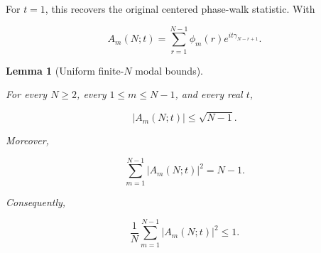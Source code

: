 \documentclass[11pt]{amsart}
\numberwithin{equation}{section}
\theoremstyle{plain}
\newtheorem{lemma}[theorem]{Lemma}
\theoremstyle{definition}
\theoremstyle{remark}
\begin{document}
For \(t=1\), this recovers the original centered phase-walk statistic.
With

\begin{equation}
A_m(N;t)
=
\sum_{r=1}^{N-1}
\phi_m(r)
e^{it\gamma_{N-r+1}}.
\label{eq:t_modal_coefficient}
\end{equation}

\begin{lemma}[Uniform finite-\(N\) modal bounds]
\label{lem:finite_modal_bounds}

For every \(N\ge2\), every \(1\le m\le N-1\), and every real \(t\),

\begin{equation}
|A_m(N;t)|
\le
\sqrt{N-1}.
\label{eq:unit_phase_modal_bound}
\end{equation}

Moreover,

\begin{equation}
\sum_{m=1}^{N-1}|A_m(N;t)|^2
=
N-1.
\label{eq:unit_phase_modal_parseval_identity}
\end{equation}

Consequently,

\begin{equation}
\frac1N
\sum_{m=1}^{N-1}|A_m(N;t)|^2
\le
1.
\label{eq:unit_phase_modal_normalized_parseval_bound}
\end{equation}

\end{lemma}
\end{document}
